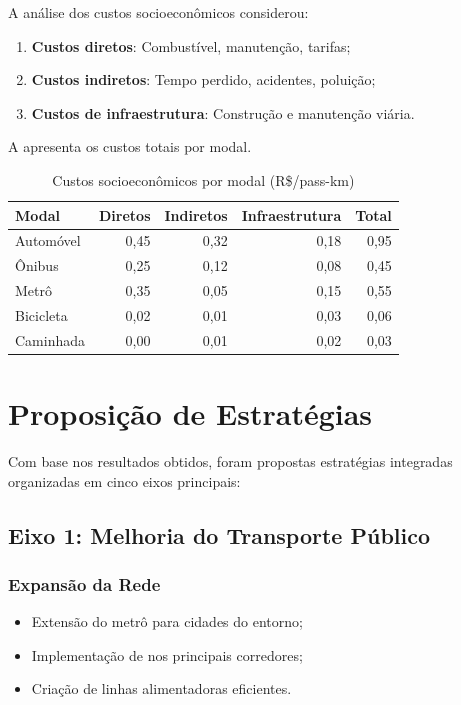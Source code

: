 A análise dos custos socioeconômicos considerou:

\begin{enumerate}
    \item \textbf{Custos diretos}: Combustível, manutenção, tarifas;
    \item \textbf{Custos indiretos}: Tempo perdido, acidentes, poluição;
    \item \textbf{Custos de infraestrutura}: Construção e manutenção viária.
\end{enumerate}

A  apresenta os custos totais por modal.

\begin{table}[htb]
    \centering
    \caption{Custos socioeconômicos por modal (R\$/pass-km)}
    \label{tab:custos-socioeconomicos}
    \begin{tabular}{lrrrr}
        \toprule
        \textbf{Modal} & \textbf{Diretos} & \textbf{Indiretos} & \textbf{Infraestrutura} & \textbf{Total} \\
        \midrule
        Automóvel & 0,45 & 0,32 & 0,18 & 0,95 \\
        Ônibus & 0,25 & 0,12 & 0,08 & 0,45 \\
        Metrô & 0,35 & 0,05 & 0,15 & 0,55 \\
        Bicicleta & 0,02 & 0,01 & 0,03 & 0,06 \\
        Caminhada & 0,00 & 0,01 & 0,02 & 0,03 \\
        \bottomrule
    \end{tabular}
\end{table}

\section{Proposição de Estratégias}

Com base nos resultados obtidos, foram propostas estratégias integradas organizadas em cinco eixos principais:

\subsection{Eixo 1: Melhoria do Transporte Público}

\subsubsection{Expansão da Rede}
\begin{itemize}
    \item Extensão do metrô para cidades do entorno;
    \item Implementação de  nos principais corredores;
    \item Criação de linhas alimentadoras eficientes.
\end{itemize}

